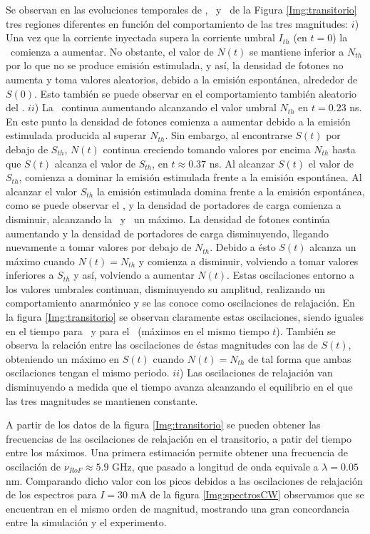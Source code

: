 		Se observan en las evoluciones temporales de \n, \s\ y \fase\ de la Figura \ref{Img:transitorio} tres regiones diferentes en funci\'on del comportamiento de las tres magnitudes: $i$) Una vez que la corriente inyectada supera la corriente umbral $I_{th}$ (en $t=0$) la \n\ comienza a aumentar. No obstante, el valor de $N(t)$ se mantiene inferior a $N_{th}$ por lo que no se produce emisión estimulada, y as\'i, la densidad de fotones no aumenta y toma valores aleatorios, debido a la emisi\'on espont\'anea, alrededor de $S(0)$. Esto tambi\'en se puede observar en el comportamiento tambi\'en aleatorio del \chirp. $ii$) La \n\ continua aumentando alcanzando el valor umbral $N_{th}$ en $t = 0.23$ ns. En este punto la densidad de fotones comienza a aumentar debido a la emisi\'on estimulada producida al superar $N_{th}$. Sin embargo, al encontrarse $S(t)$ por debajo de $S_{th}$, $N(t)$ continua creciendo tomando valores por encima $N_{th}$ hasta que $S(t)$ alcanza el valor de $S_{th}$, en $t \approx 0.37$ ns. Al alcanzar $S(t)$ el valor de $S_{th}$, comienza a dominar la emisi\'on estimulada frente a la emisi\'on espont\'anea. Al alcanzar el valor $S_{th}$ la emisi\'on estimulada domina frente a la emisi\'on espont\'anea, como se puede observar el \chirp, y la densidad de portadores de carga comienza a disminuir, alcanzando la \n\ y \chirp\ un m\'aximo. La densidad de fotones contin\'ua aumentando y la densidad de portadores de carga disminuyendo, llegando nuevamente a tomar valores por debajo de $N_{th}$. Debido a \'esto $S(t)$ alcanza un m\'aximo cuando $N(t) = N_{th}$ y comienza a disminuir, volviendo a tomar valores inferiores a $S_{th}$ y as\'i, volviendo a aumentar $N(t)$. Estas oscilaciones entorno a los valores umbrales continuan, disminuyendo su amplitud, realizando un comportamiento anarm\'onico y se las conoce como oscilaciones de relajaci\'on. En la figura \ref{Img:transitorio} se observan claramente estas oscilaciones, siendo iguales en el tiempo para \n\ y para el \chirp\ (m\'aximos en el mismo tiempo $t$). Tambi\'en se observa la relaci\'on entre las oscilaciones de \'estas magnitudes con las de $S(t)$, obteniendo un m\'aximo en $S(t)$ cuando $N(t) = N_{th}$ de tal forma que ambas oscilaciones tengan el mismo periodo. $ii$) Las oscilaciones de relajaci\'on van disminuyendo a medida que el tiempo avanza alcanzando el equilibrio en el que las tres magnitudes se mantienen constante.

		A partir de los datos de la figura \ref{Img:transitorio} se pueden obtener las frecuencias de las oscilaciones de relajaci\'on en el transitorio, a patir del tiempo entre los m\'aximos. Una primera estimaci\'on permite obtener una frecuencia de oscilaci\'on de $\nu_{RoF} \approx 5.9$ GHz, que pasado a longitud de onda equivale a $\lambda = 0.05$ nm. Comparando dicho valor con los picos debidos a las oscilaciones de relajaci\'on de los espectros para $I = 30$ mA de la figura \ref{Img:spectrosCW} observamos que se encuentran en el mismo orden de magnitud, mostrando una gran concordancia entre la simulaci\'on y el experimento.
